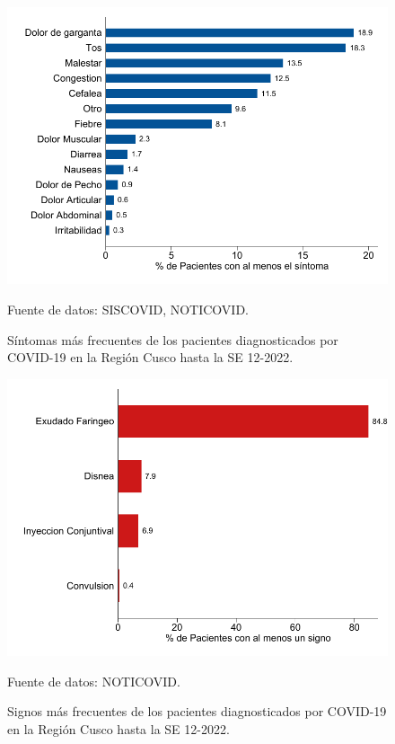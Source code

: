 \documentclass[12pt,a4paper,openany]{book}
\begin{document}
\begin{figure}[h]
	\caption{Síntomas más frecuentes de los pacientes diagnosticados por COVID-19 en la Región Cusco hasta la SE 12-2022.  }\label{fig:sintomas}
	\begin{center}
		\includegraphics[width=0.85\linewidth]{../figuras/figura_sintoma.pdf}
	\end{center}
	{\footnotesize {Fuente de datos: SISCOVID, NOTICOVID.}}
\end{figure}

\begin{figure}[h]
	\caption{Signos más frecuentes de los pacientes diagnosticados por COVID-19 en la Región Cusco hasta la SE 12-2022.}\label{fig:signos}
	\begin{center}
		\includegraphics[width=0.65\linewidth]{../figuras/figura_signo.pdf}
	\end{center}
	{\footnotesize {Fuente de datos: NOTICOVID.}}
\end{figure}
\end{document}
